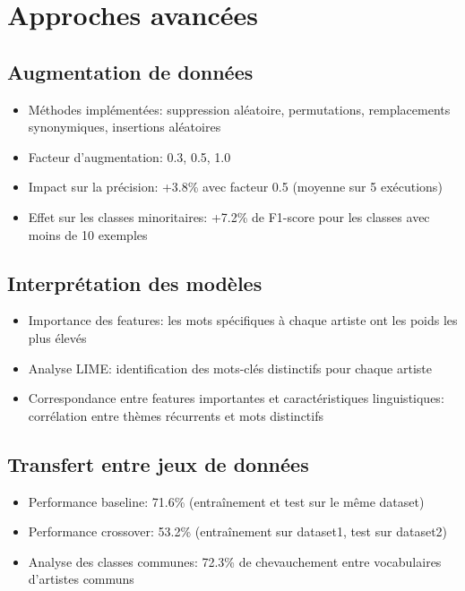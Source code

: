 \documentclass[a4paper,11pt]{article}
\begin{document}
\section{Approches avancées}
\label{sec:advanced}

\subsection{Augmentation de données}
\begin{itemize}
    \item Méthodes implémentées: suppression aléatoire, permutations, remplacements synonymiques, insertions aléatoires
    \item Facteur d'augmentation: 0.3, 0.5, 1.0
    \item Impact sur la précision: +3.8\% avec facteur 0.5 (moyenne sur 5 exécutions)
    \item Effet sur les classes minoritaires: +7.2\% de F1-score pour les classes avec moins de 10 exemples
\end{itemize}

\subsection{Interprétation des modèles}
\begin{itemize}
    \item Importance des features: les mots spécifiques à chaque artiste ont les poids les plus élevés
    \item Analyse LIME: identification des mots-clés distinctifs pour chaque artiste
    \item Correspondance entre features importantes et caractéristiques linguistiques: corrélation entre thèmes récurrents et mots distinctifs
\end{itemize}

\subsection{Transfert entre jeux de données}
\begin{itemize}
    \item Performance baseline: 71.6\% (entraînement et test sur le même dataset)
    \item Performance crossover: 53.2\% (entraînement sur dataset1, test sur dataset2)
    \item Analyse des classes communes: 72.3\% de chevauchement entre vocabulaires d'artistes communs
\end{itemize}
\end{document}
